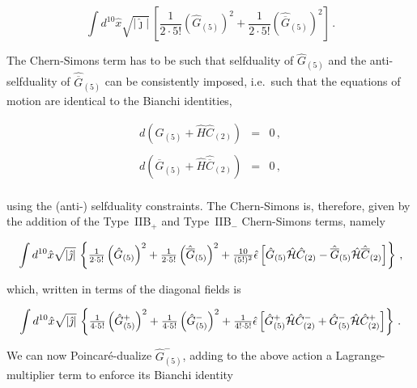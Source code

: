 \documentclass[12pt,a4paper]{article}
\begin{document}
\begin{equation}
\int d^{10}\hat{x}\sqrt{|\hat{\jmath}|}\,
\left[ 
{\textstyle\frac{1}{2\cdot 5!}}\left(\hat{G}_{(5)}\right)^{2}
+{\textstyle\frac{1}{2\cdot 5!}}\left(\hat{\overline{G}}_{(5)}\right)^{2}
\right]\, .
\end{equation}

The Chern-Simons term has to be such that selfduality of
$\hat{G}_{(5)}$ and the anti-selfduality of $\hat{\overline{G}}_{(5)}$ can
be consistently imposed, i.e.~such that the equations of motion are
identical to the Bianchi identities, 

\begin{equation}
\begin{array}{rcl}
d\left(\hat{G}_{(5)} +\hat{H}\hat{C}_{(2)}\right) 
& = & 0\, ,\\
& & \\
d\left(\hat{\overline{G}}_{(5)} +\hat{H}\hat{\overline{C}}_{(2)}\right) 
& = & 0\, ,\\
\end{array}
\end{equation}

\noindent using the (anti-) selfduality constraints. The Chern-Simons 
is, therefore, given by the addition of the Type~IIB$_{+}$ and
Type~IIB$_{-}$ Chern-Simons terms, namely

\begin{equation}
\int d^{10}\hat{x}\sqrt{|\hat{\jmath}|}\, \left\{
{\textstyle\frac{1}{2\cdot 5!}}\left(\hat{G}_{(5)}\right)^{2}
+{\textstyle\frac{1}{2\cdot 5!}}\left(\hat{\overline{G}}_{(5)}\right)^{2}
+{\textstyle\frac{10}{(5!)^{2}}}\hat{\epsilon}
\left[\hat{G}_{(5)}\hat{\cal H}\hat{C}_{(2)}
-\hat{\overline{G}}_{(5)}\hat{\cal H}\hat{\overline{C}}_{(2)}\right]
\right\}\, ,
\end{equation}

\noindent which, written in terms of the diagonal fields is

\begin{equation}
\int d^{10}\hat{x}\sqrt{|\hat{\jmath}|}\, \left\{
{\textstyle\frac{1}{4\cdot 5!}}\left(\hat{G}^{+}_{(5)}\right)^{2}
+{\textstyle\frac{1}{4\cdot 5!}}\left(\hat{G}^{-}_{(5)}\right)^{2}
+{\textstyle\frac{1}{4!\cdot5!}}\hat{\epsilon}
\left[\hat{G}^{+}_{(5)}\hat{\cal H}\hat{C}^{-}_{(2)}
+\hat{G}^{-}_{(5)}\hat{\cal H}\hat{C}^{+}_{(2)}\right]
\right\}\, .
\end{equation}

We can now Poincar\'e-dualize $\hat{G}^{-}_{(5)}$, adding to the above
action a Lagrange-multiplier term to enforce its Bianchi identity
\end{document}

